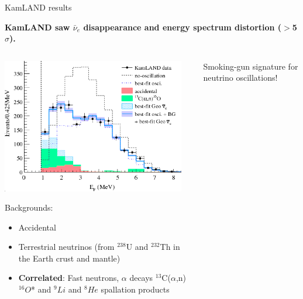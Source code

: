 \begin{frame}[t]{KamLAND results}

{\small \bf \centering
KamLAND saw $\bar{\nu}_{e}$ disappearance and energy spectrum distortion ($>$5$\sigma$).\\
}
\vspace{0.3cm}
\begin{columns}
  \begin{column}{0.40\textwidth}
     \includegraphics[width=0.95\textwidth]{./images/3nu/reactor/kamLAND_energy_spectrum_noeff.png}\\
     {\scriptsize
     Backgrounds:\\
     \begin{itemize}
        \item Accidental
        \item Terrestrial neutrinos (from $^{238}$U and $^{232}$Th in the Earth crust and mantle)
        \item {\bf Correlated}: Fast neutrons, $\alpha$ decays $^{13}$C($\alpha$,n)$^{16}O$* and
              $^{9}Li$ and $^{8}He$ spallation products
     \end{itemize}
     }
  \end{column}
  \begin{column}{0.60\textwidth}
    \centering
     {\small \color{red}Smoking-gun signature for neutrino oscillations!}\\

\end{column}
\end{columns}
\end{frame}
